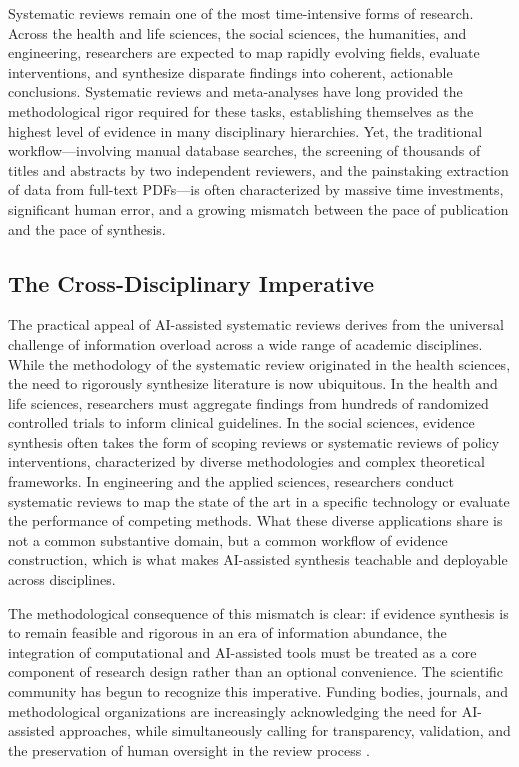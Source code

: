 \documentclass[12pt]{article}
\begin{document}
Systematic reviews remain one of the most time-intensive forms of research. Across the health and life sciences, the social sciences, the humanities, and engineering, researchers are expected to map rapidly evolving fields, evaluate interventions, and synthesize disparate findings into coherent, actionable conclusions. Systematic reviews and meta-analyses have long provided the methodological rigor required for these tasks, establishing themselves as the highest level of evidence in many disciplinary hierarchies. Yet, the traditional workflow---involving manual database searches, the screening of thousands of titles and abstracts by two independent reviewers, and the painstaking extraction of data from full-text PDFs---is often characterized by massive time investments, significant human error, and a growing mismatch between the pace of publication and the pace of synthesis.

\subsection{The Cross-Disciplinary Imperative}

The practical appeal of AI-assisted systematic reviews derives from the universal challenge of information overload across a wide range of academic disciplines. While the methodology of the systematic review originated in the health sciences, the need to rigorously synthesize literature is now ubiquitous. In the health and life sciences, researchers must aggregate findings from hundreds of randomized controlled trials to inform clinical guidelines. In the social sciences, evidence synthesis often takes the form of scoping reviews or systematic reviews of policy interventions, characterized by diverse methodologies and complex theoretical frameworks. In engineering and the applied sciences, researchers conduct systematic reviews to map the state of the art in a specific technology or evaluate the performance of competing methods. What these diverse applications share is not a common substantive domain, but a common workflow of evidence construction, which is what makes AI-assisted synthesis teachable and deployable across disciplines.

The methodological consequence of this mismatch is clear: if evidence synthesis is to remain feasible and rigorous in an era of information abundance, the integration of computational and AI-assisted tools must be treated as a core component of research design rather than an optional convenience. The scientific community has begun to recognize this imperative. Funding bodies, journals, and methodological organizations are increasingly acknowledging the need for AI-assisted approaches, while simultaneously calling for transparency, validation, and the preservation of human oversight in the review process \citep{flemyng2025ai}.
\end{document}
